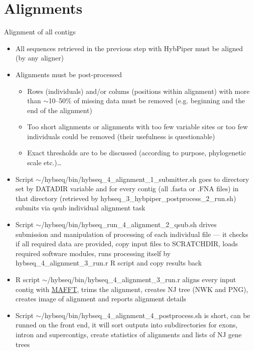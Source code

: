 \documentclass[compress,  xelatex, 11pt, xcolor=x11names, aspectratio=169,
	hyperref={
		bookmarks=true,
		unicode=true,
		colorlinks=true,
		pdftitle={HybSeq course},
		plainpages=false,
		pdfauthor={Vojtech Zeisek},
		pdfsubject={Practical processing of HybSeq target enrichment sequencing data on computing grids like MetaCentrum},
		pdfcreator={XeLaTeX},
		pdfkeywords={BASH, command line, GNU, HybSeq, Linux, MetaCentrum, sequencing shell, target enrichment},
		linkcolor=Turquoise4, %
		anchorcolor=DodgerBlue4, %
		citecolor=DodgerBlue4, %
		filecolor=DodgerBlue4, %
		menucolor=Tan4, %
		urlcolor=DarkOliveGreen4 %
		},
	url={hyphens, lowtilde} %
	]{beamer}
\renewcommand{\texttt}[1]{\colorbox{Cornsilk2}{{\ttfamily #1}}}
\begin{document}
\section{Alignments}

\begin{frame}[allowframebreaks]{Alignment of all contigs}
	\begin{itemize}
		\item All sequences retrieved in the previous step with HybPiper must be aligned (by any aligner)
		\item Alignments must be post-processed
		\begin{itemize}
			\item Rows (individuals) and/or colums (positions within alignment) with more than $\sim$10--50\% of missing data must be removed (e.g. beginning and the end of the alignment)
			\item Too short alignments or alignments with too few variable sites or too few individuals could be removed (their usefulness is questionable)
			\item Exact thresholds are to be discussed (according to purpose, phylogenetic scale etc.)\ldots
		\end{itemize}
		\item Script \texttt{$\sim$/hybseq/bin/hybseq\_4\_alignment\_1\_submitter.sh} goes to directory set by \texttt{DATADIR} variable and for every contig (all \texttt{*.fasta} or \texttt{*.FNA} files) in that directory (retrieved by \texttt{hybseq\_3\_hybpiper\_postprocess\_2\_run.sh}) submits via \texttt{qsub} individual alignment task
		\item Script \texttt{$\sim$/hybseq/bin/hybseq\_run\_4\_alignment\_2\_qsub.sh} drives submission and manipulation of processing of each individual file --- it checks if all required data are provided, copy input files to \texttt{SCRATCHDIR}, loads required software modules, runs processing itself by \texttt{hybseq\_4\_alignment\_3\_run.r} \texttt{R} script and copy results back
		\item \texttt{R} script \texttt{$\sim$/hybseq/bin/hybseq\_4\_alignment\_3\_run.r} aligns every input contig with \href{https://mafft.cbrc.jp/alignment/software/}{MAFFT}, trims the alignment, creates NJ tree (NWK and PNG), creates image of alignment and reports alignment details
		\item Script \texttt{$\sim$/hybseq/bin/hybseq\_4\_alignment\_4\_postprocess.sh} is short, can be runned on the front end, it will sort outputs into subdirectories for exons, intron and supercontigs, create statistics of alignments and lists of NJ gene trees
	\end{itemize}
\end{frame}
\end{document}
